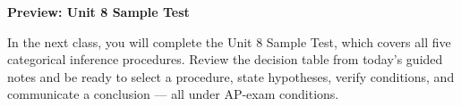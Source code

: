\documentclass[10pt]{article}
\begin{document}
\begin{reflectionbox}
\textbf{Preview: Unit 8 Sample Test}

In the next class, you will complete the Unit 8 Sample Test, which covers all five categorical
inference procedures. Review the decision table from today's guided notes and be ready to select
a procedure, state hypotheses, verify conditions, and communicate a conclusion --- all under
AP-exam conditions.
\end{reflectionbox}
\end{document}
